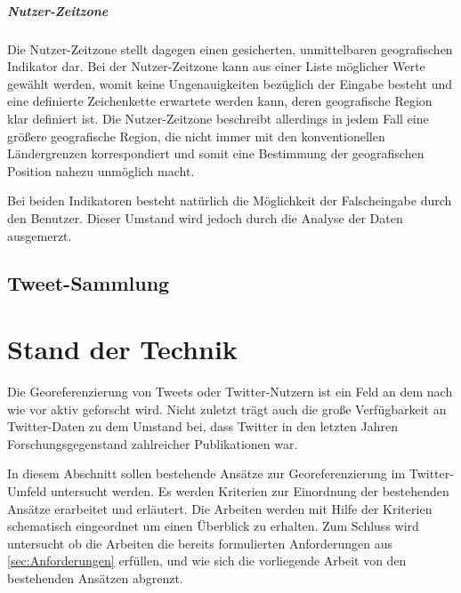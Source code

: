 					\paragraph{Nutzer-Zeitzone} 

						Die Nutzer-Zeitzone stellt dagegen einen gesicherten, unmittelbaren geografischen Indikator dar.
						Bei der Nutzer-Zeitzone kann aus einer Liste möglicher Werte gewählt werden, womit keine Ungenauigkeiten bezüglich der Eingabe besteht und eine definierte Zeichenkette erwartete werden kann, deren geografische Region klar definiert ist. 
						Die Nutzer-Zeitzone beschreibt allerdings in jedem Fall eine größere geografische Region, die nicht immer mit den konventionellen Ländergrenzen korrespondiert und somit eine Bestimmung der geografischen Position nahezu unmöglich macht.

						Bei beiden Indikatoren besteht natürlich die Möglichkeit der Falscheingabe durch den Benutzer. Dieser Umstand wird jedoch durch die Analyse der Daten ausgemerzt.  

	\section{Tweet-Sammlung} 
		

			
\chapter{Stand der Technik} 
	Die Georeferenzierung von Tweets oder Twitter-Nutzern ist ein Feld an dem nach wie vor aktiv geforscht wird.
	Nicht zuletzt trägt auch die große Verfügbarkeit an Twitter-Daten zu dem Umstand bei, dass Twitter in den letzten Jahren Forschungsgegenstand zahlreicher Publikationen war. 
	
	In diesem Abschnitt sollen bestehende Ansätze zur Georeferenzierung im Twitter-Umfeld untersucht werden. 
	Es werden Kriterien zur Einordnung der bestehenden Ansätze erarbeitet und erläutert.   
	Die Arbeiten werden mit Hilfe der Kriterien schematisch eingeordnet um einen Überblick zu erhalten. 
	Zum Schluss wird untersucht ob die Arbeiten die bereits formulierten Anforderungen aus \ref{sec:Anforderungen} erfüllen, und wie sich die vorliegende Arbeit von den bestehenden Ansätzen abgrenzt.    

